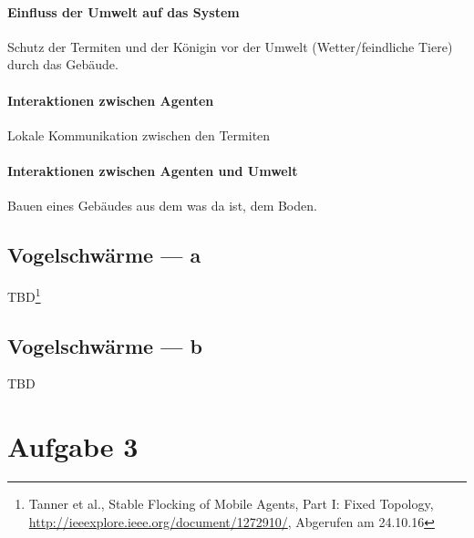 \documentclass[10pt]{article}%
\theoremstyle{nonumberplain}
\begin{document}
\paragraph{Einfluss der Umwelt auf das System}
Schutz der Termiten und der Königin vor der Umwelt (Wetter/feindliche Tiere) durch das Gebäude.
\paragraph{Interaktionen zwischen Agenten}
Lokale Kommunikation zwischen den Termiten
\paragraph{Interaktionen zwischen Agenten und Umwelt}
Bauen eines Gebäudes aus dem was da ist, dem Boden.
\subsection{Vogelschwärme --- a}
TBD\footnote{Tanner et al., Stable Flocking of Mobile Agents, Part I: Fixed
	Topology, \url{http://ieeexplore.ieee.org/document/1272910/}, Abgerufen am 24.10.16}
\subsection{Vogelschwärme --- b}
TBD
\section{Aufgabe 3}
\end{document}
